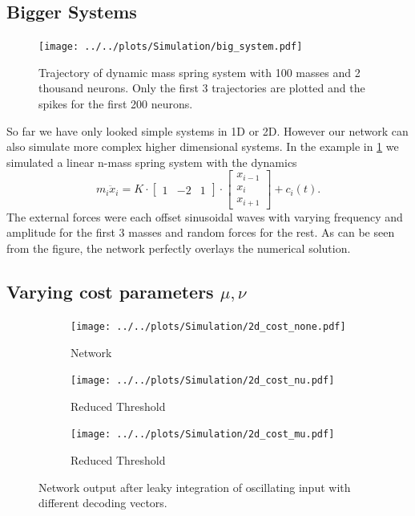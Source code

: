 \subsection{Bigger Systems}
\begin{figure}[h!]
	\centering
		\texttt{[image: ../../plots/Simulation/big\_system.pdf]}
	\caption{Trajectory of dynamic mass spring system with 100 masses and 2 thousand neurons. Only the first 3 trajectories are plotted and the spikes for the first 200 neurons.	}
	\label{fig:big_systems}
\end{figure}

So far we have only looked simple systems in 1D or 2D. However our network can also simulate more complex higher dimensional systems.
In the example in \cref{fig:big_systems} we simulated a linear n-mass spring system with the dynamics
\begin{equation}
	m_i\ddot{x}_i = K\cdot \begin{bmatrix}
	1&-2&1
	\end{bmatrix} \cdot	\begin{bmatrix}
	x_{i-1}\\
	x_i\\
	x_{i+1}
	\end{bmatrix} + c_i(t).
\end{equation}
The external forces were each offset sinusoidal waves with varying frequency and amplitude for the first 3 masses and random forces for the rest. As can be seen from the figure, the network perfectly overlays the numerical solution.


\subsection{Varying cost parameters $\mu,\nu$}
\begin{figure}[h!]
	\centering
	\begin{subfigure}[t]{0.6\textwidth}
		\centering
		\texttt{[image: ../../plots/Simulation/2d\_cost\_none.pdf]}
		\caption{Network }
		\label{fig:sim_no_cost}
	\end{subfigure}
	\hfill
	\begin{subfigure}[t]{0.6\textwidth}
		\centering
		\texttt{[image: ../../plots/Simulation/2d\_cost\_nu.pdf]}
		\caption{Reduced Threshold}
		\label{fig:sim_nu_cost}
	\end{subfigure}
	\hfill
	\begin{subfigure}[t]{0.6\textwidth}
		\centering
		\texttt{[image: ../../plots/Simulation/2d\_cost\_mu.pdf]}
		\caption{Reduced Threshold}
		\label{fig:sim_mu_cost}
	\end{subfigure}
	\caption{Network output after leaky integration of oscillating input with different decoding vectors.}
	\label{fig:sim_res_4}
\end{figure}

